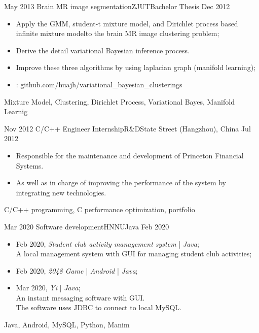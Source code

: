 \begin{experiences}
  \emptySeparator
  \experience
  {May 2013} {Brain MR image segmentation}{ZJUT}{Bachelor Thesis}
  {Dec 2012 }    {
				  	\begin{itemize}
				  		\item Apply the GMM, student-t mixture model, and Dirichlet process based infinite mixture modelto the brain MR image clustering problem; 
				  		\item Derive the detail variational Bayesian inference process.
				  		\item Improve these three algorithms by using laplacian graph (manifold learning); 				  	              
				  		\item \faGithub:  {github.com/huajh/variational\_bayesian\_clusterings}                                                                                    
				  	\end{itemize}
				  }
				  {Mixture Model, Clustering, Dirichlet Process, Variational Bayes, Manifold Learnig}
				  
  \emptySeparator
  \experience
  {Nov 2012} {C/C++ Engineer Internship}{R\&D}{State Street (Hangzhou), China}
  {Jul 2012 }    {
  	\begin{itemize}
  		\item  Responsible for the maintenance and development of Princeton Financial Systems. 
  		\item As well as in charge of improving the performance of the system by integrating new technologies.
  	\end{itemize}
  }
  {C/C++ programming, C performance optimization, portfolio}
  	
  \emptySeparator
  \experience%
  {Mar 2020} {Software development}{HNNU}{Java}
  {Feb 2020}    		{
				  	\begin{itemize}
				  		\item  Feb 2020, \emph{Student club activity management system} | \emph{Java};\\
						A local management system with GUI for managing student club activities;
				  		\item  Feb 2020, \emph{2048 Game} | \emph{Android} | \emph{Java};
				  		\item  Mar 2020, \emph{Yi} | \emph{Java};\\
						An instant messaging software with GUI.\\
						The software uses JDBC to connect to local MySQL.
				  	\end{itemize}
				  }
				  {Java, Android, MySQL, Python, Manim}
				  

\end{experiences}
